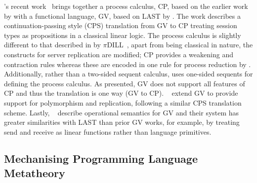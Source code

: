 \documentclass{mprop}
\newcommand{\1}{\textbf{1}\xspace}
\begin{document}
\citeauthor{Wadler:2012}'s recent work~\cite{Wadler:2012} brings together a process calculus, CP, based on the earlier work by \citeauthor{Caires:2010:STI} with a functional language, GV, based on LAST by \citeauthor{Gay:2010:LAST}. The work describes a continuation-passing style (CPS) translation from GV to CP treating session types as propositions in a classical linear logic. The process calculus is slightly different to that described in by $\pi$DILL~\cite{Caires:2010:STI}, apart from being classical in nature, the constructs for server replication are modified; CP provides a weakening and contraction rules whereas these are encoded in one rule for process reduction by \citeauthor{Caires:2010:STI}. Additionally, rather than a two-sided sequent calculus, \citeauthor{Wadler:2012} uses one-sided sequents for defining the process calculus. As presented, GV does not support all features of CP and thus the translation is one way (GV to CP). \citeauthor{Lindley:2014:SAP}~\cite{Lindley:2014:SAP} extend GV to provide support for polymorphism and replication, following a similar CPS translation scheme. Lastly, \citeauthor{Lindley:2014:SPS}~\cite{Lindley:2014:SPS} describe operational semantics for GV and their system has greater similarities with LAST than prior GV works, for example, by treating send and receive as linear functions rather than language primitives.


\subsection{Mechanising Programming Language Metatheory}
\end{document}
